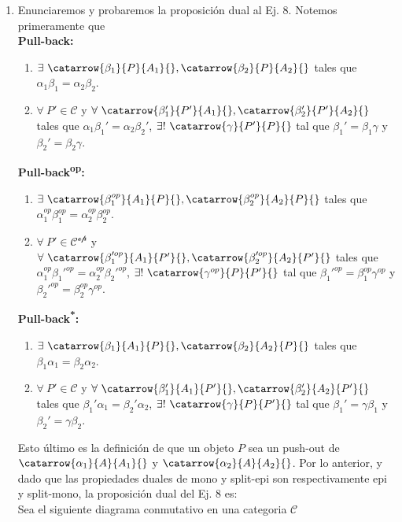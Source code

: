 \documentclass{article}
\begin{document}
\begin{enumerate}[label=\textbf{Ej \arabic*.}]
		\item Enunciaremos y probaremos la proposición dual al Ej. 8. Notemos primeramente que\\
		\textbf{Pull-back:}\begin{enumerate}[label=PB\Roman*)]
			\item $\exists\ \catarrow{\beta_1}{P}{A_1}{},\catarrow{\beta_2}{P}{A_2}{}$ tales que $\alpha_1\beta_1=\alpha_2\beta_2$.
			\item $\forall\ P'\in\mathscr{C}$ y $\forall\ \catarrow{\beta_1'}{P'}{A_1}{},\catarrow{\beta_2'}{P'}{A_2}{}$ tales que $\alpha_1\beta_1'=\alpha_2\beta_2'$, $\exists !\ \catarrow{\gamma}{P'}{P}{}$ tal que $\beta_1'=\beta_1\gamma$ y $\beta_2'=\beta_2\gamma$.
		\end{enumerate}
		\textbf{Pull-back\textsuperscript{op}:}\begin{enumerate}[label=PB\textsuperscript{op}\Roman*)]
		\item $\exists\ \catarrow{\beta_1^{op}}{A_1}{P}{},\catarrow{\beta_2^{op}}{A_2}{P}{}$ tales que $\alpha_1^{op}\beta_1^{op}=\alpha_2^{op}\beta_2^{op}$.
		\item $\forall\ P'\in\mathscr{C^{op}}$ y $\forall\ \catarrow{\beta_1'^{op}}{A_1}{P'}{},\catarrow{\beta_2'^{op}}{A_2}{P'}{}$ tales que $\alpha_1^{op}\beta_1'^{op}=\alpha_2^{op}\beta_2'^{op}$, $\exists !\ \catarrow{\gamma^{op}}{P}{P'}{}$ tal que $\beta_1'^{op}=\beta_1^{op}\gamma^{op}$ y $\beta_2'^{op}=\beta_2^{op}\gamma^{op}$.
	\end{enumerate}
	\textbf{Pull-back\textsuperscript{*}:}\begin{enumerate}[label=PB\textsuperscript{*}\Roman*)]
	\item $\exists\ \catarrow{\beta_1}{A_1}{P}{},\catarrow{\beta_2}{A_2}{P}{}$ tales que $\beta_1\alpha_1=\beta_2\alpha_2$.
	\item $\forall\ P'\in\mathscr{C}$ y $\forall\ \catarrow{\beta_1'}{A_1}{P'}{},\catarrow{\beta_2'}{A_2}{P'}{}$ tales que $\beta_1'\alpha_1=\beta_2'\alpha_2$, $\exists !\ \catarrow{\gamma}{P}{P'}{}$ tal que $\beta_1'=\gamma\beta_1$ y $\beta_2'=\gamma\beta_2$.
	\end{enumerate}
	Esto último es la definición de que un objeto $P$ sea un push-out de $\catarrow{\alpha_1}{A}{A_1}{}$ y $\catarrow{\alpha_2}{A}{A_2}{}$. Por lo anterior, y dado que las propiedades duales de mono y split-epi son respectivamente epi y split-mono, la proposición dual del Ej. 8 es:\\
	Sea el siguiente diagrama conmutativo en una categoria $\mathscr{C}$
	\begin{equation*}

\end{equation*}
\end{enumerate}
\end{document}
